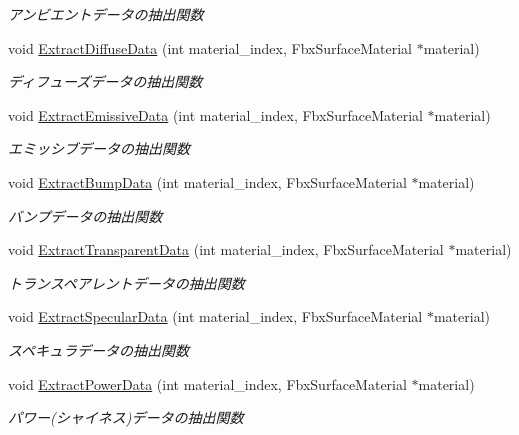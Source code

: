 \begin{DoxyCompactItemize}
\begin{DoxyCompactList}\small\item\em アンビエントデータの抽出関数 \end{DoxyCompactList}\item 
void \mbox{\hyperlink{class_fbx_converter_a60e517313041e75f081effceb74e7c56}{Extract\+Diffuse\+Data}} (int material\+\_\+index, Fbx\+Surface\+Material $\ast$material)
\begin{DoxyCompactList}\small\item\em ディフューズデータの抽出関数 \end{DoxyCompactList}\item 
void \mbox{\hyperlink{class_fbx_converter_ae43f5f7858379aa57f1dbc1373c66b77}{Extract\+Emissive\+Data}} (int material\+\_\+index, Fbx\+Surface\+Material $\ast$material)
\begin{DoxyCompactList}\small\item\em エミッシブデータの抽出関数 \end{DoxyCompactList}\item 
void \mbox{\hyperlink{class_fbx_converter_abc1470186342a7aabb60818cd4813a1a}{Extract\+Bump\+Data}} (int material\+\_\+index, Fbx\+Surface\+Material $\ast$material)
\begin{DoxyCompactList}\small\item\em バンプデータの抽出関数 \end{DoxyCompactList}\item 
void \mbox{\hyperlink{class_fbx_converter_a888c4e3d638aa79fa524b85a67f01f5d}{Extract\+Transparent\+Data}} (int material\+\_\+index, Fbx\+Surface\+Material $\ast$material)
\begin{DoxyCompactList}\small\item\em トランスペアレントデータの抽出関数 \end{DoxyCompactList}\item 
void \mbox{\hyperlink{class_fbx_converter_a2ff36051144ed83860d0287a953778b4}{Extract\+Specular\+Data}} (int material\+\_\+index, Fbx\+Surface\+Material $\ast$material)
\begin{DoxyCompactList}\small\item\em スペキュラデータの抽出関数 \end{DoxyCompactList}\item 
void \mbox{\hyperlink{class_fbx_converter_aa2d0d302ad6691934164dfdf1f5f6590}{Extract\+Power\+Data}} (int material\+\_\+index, Fbx\+Surface\+Material $\ast$material)
\begin{DoxyCompactList}\small\item\em パワー(シャイネス)データの抽出関数 \end{DoxyCompactList}\item 

\end{DoxyCompactItemize}
